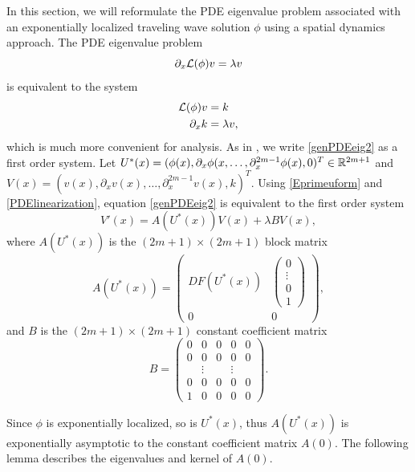 \documentclass[11pt,reqno]{amsart}
\theoremstyle{plain}
\theoremstyle{definition}
\theoremstyle{remark}
\begin{document}
In this section, we will reformulate the PDE eigenvalue problem associated with an exponentially localized traveling wave solution $\phi$ using a spatial dynamics approach.  The PDE eigenvalue problem
\begin{equation}\label{genPDEeig}
\partial_x \mathcal{L}(\phi) v = \lambda v
\end{equation}
is equivalent to the system
\begin{equation}\label{genPDEeig2}
\begin{aligned}
\mathcal{L}(\phi) v &= k \\
\partial_x k &= \lambda v,
\end{aligned}
\end{equation}
which is much more convenient for analysis. As in \cite{Sandstede1998}, we write \cref{genPDEeig2} as a first order system. Let $U^*(x) = (\phi(x), \partial_x \phi(x, \dots, \partial_x^{2m-1}\phi(x), 0)^T \in \mathbb{R}^{2m+1}$ and $V(x) = (v(x), \partial_x v(x), \dots, \partial_x^{2m-1} v(x), k)^T$. Using \cref{Eprimeuform} and \cref{PDElinearization}, equation \cref{genPDEeig2} is equivalent to the first order system
\begin{equation}\label{PDEeigsystem}
V'(x) = A(U^*(x))V(x) + \lambda B V(x),
\end{equation}
where $A(U^*(x))$ is the $(2m+1) \times (2m+1)$ block matrix
\begin{equation}\label{defAblock}
A(U^*(x)) = 
\begin{pmatrix}
DF(U^*(x)) & \begin{pmatrix} 0 \\ \vdots \\ 0 \\ 1 \end{pmatrix} \\
0 & 0
\end{pmatrix},
\end{equation}
and $B$ is the $(2m+1) \times (2m+1)$ constant coefficient matrix
\begin{equation}\label{DefB}
B = \begin{pmatrix}0 & 0 & 0 & 0 & 0 \\0 & 0 & 0 & 0 & 0 \\  & 
\vdots & & \vdots & \\0 & 0 & 0 & 0 & 0 \\1 & 0 & 0 & 0 & 0 \end{pmatrix}.
\end{equation}

Since $\phi$ is exponentially localized, so is $U^*(x)$, thus $A(U^*(x))$ is exponentially asymptotic to the constant coefficient matrix $A(0)$. The following lemma describes the eigenvalues and kernel of $A(0)$.
\end{document}
